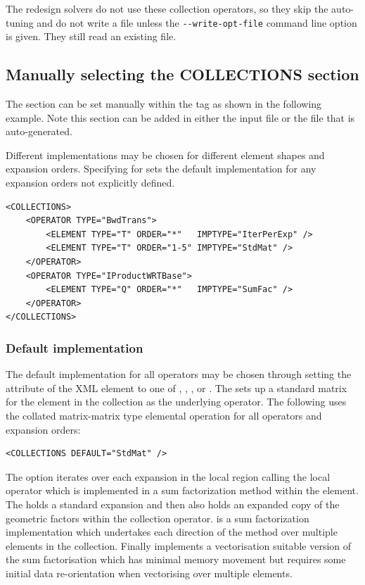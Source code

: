 The redesign solvers do not use these collection operators, so they
skip the auto-tuning and do not write a  file unless
the \lstinline[style=BashInputStyle]{--write-opt-file} command line
option is given. They still read an existing  file.


\subsection{Manually selecting the COLLECTIONS section} 

The  section can be set manually within the
 tag as shown in the following example. Note this
section can be added in either the input  file or
the  file that is auto-generated.

Different implementations may be chosen for different element shapes and
expansion orders.  Specifying \inltt{*} for  sets the
default implementation for any expansion orders not explicitly defined.

\begin{lstlisting}[style=XmlStyle]
<COLLECTIONS>
    <OPERATOR TYPE="BwdTrans">
        <ELEMENT TYPE="T" ORDER="*"   IMPTYPE="IterPerExp" />
        <ELEMENT TYPE="T" ORDER="1-5" IMPTYPE="StdMat" />
    </OPERATOR>
    <OPERATOR TYPE="IProductWRTBase">
        <ELEMENT TYPE="Q" ORDER="*"   IMPTYPE="SumFac" />
    </OPERATOR>
</COLLECTIONS>
\end{lstlisting}

\subsubsection{Default implementation}
The default implementation for all operators may be chosen through
setting the  attribute of the  XML
element to one of , , ,
 or . The  sets up
a standard matrix for the element in the collection as the underlying
operator. The following uses the collated matrix-matrix type elemental
operation for all operators and expansion orders:

\begin{lstlisting}[style=XmlStyle]
<COLLECTIONS DEFAULT="StdMat" />
\end{lstlisting}

The  option iterates over each expansion
in the local region calling the local operator which is implemented in
a sum factorization method within the element. The 
holds a standard expansion and then also holds an expanded copy of the
geometric factors within the collection operator.  is a
sum factorization implementation which undertakes each direction of
the method over multiple elements in the collection. Finally
 implements a vectorisation suitable version of the
sum factorisation which has minimal memory movement but requires some
initial data re-orientation when vectorising over multiple elements. 

